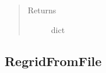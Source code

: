 \documentclass[letterpaper,10pt,english]{sphinxmanual}
\begin{document}
\begin{fulllineitems}
\begin{fulllineitems}
\begin{quote}
\begin{description}
\item[{Returns}] \leavevmode
dict

\end{description}\end{quote}

\end{fulllineitems}


\end{fulllineitems}



\subsection{RegridFromFile}
\label{\detokenize{regridfromfile:regridfromfile}}\label{\detokenize{regridfromfile::doc}}
\end{document}
